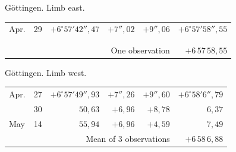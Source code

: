 \noindent\begin{minipage}[t]{.495\textwidth}\centering Göttingen. Limb east.\par\smallskip
{\scriptsize\setlength{\tabcolsep}{1pt}\renewcommand{\arraystretch}{1.2}\begin{tabular}{lr|r|r|r|r|}
Apr.&29&$+6^\circ57'42''{,}47$&$+7''{,}02$&$+9''{,}06$&$+6^\circ57'58''{,}55$\\
&&&&&\\
&&&&&\\
\cline{6-6}\multicolumn{5}{r}{One observation}&$+6\,57\,58{,}55$
\end{tabular}}\end{minipage}\hfill\begin{minipage}[t]{.495\textwidth}\centering Göttingen. Limb west.\par\smallskip
{\scriptsize\setlength{\tabcolsep}{1pt}\renewcommand{\arraystretch}{1.2}\begin{tabular}{lr|r|r|r|r}
Apr.&27&$+6^\circ57'49''{,}93$&$+7''{,}26$&$+9''{,}60$&$+6^\circ58'6''{,}79$\\
&30&$50{,}63$&$+6{,}96$&$+8{,}78$&$6{,}37$\\
May&14&$55{,}94$&$+6{,}96$&$+4{,}59$&$7{,}49$\\
\cline{6-6}\multicolumn{5}{r}{Mean of 3 observations}&$+6\,58\,6{,}88$
\end{tabular}}\end{minipage}
\par\vspace{4mm}

